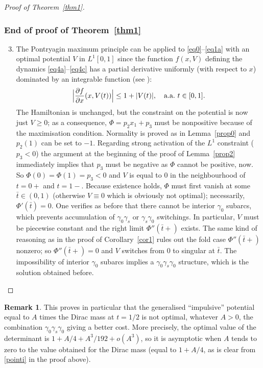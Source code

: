 \documentclass[10pt,a4paper]{amsart}
\providecommand{\Subsubsection}{\subsubsection}
\theoremstyle{plain}
\theoremstyle{definition}
\newtheorem{remark}[theorem]{Remark}
\renewcommand{\dot}[1]{#1'}
\renewcommand{\ddot}[1]{#1''}
\newcommand{\frp}[2]{\frac{\partial #1}{\partial #2}}
\begin{document}
\begin{proof}[Proof of Theorem~\ref{thm1}]
\Subsubsection*{End of proof of Theorem~\ref{thm1}}
\begin{enumerate}\setcounter{enumi}{2}
\item\label{pointiii}
The Pontryagin maximum principle can be applied to \eqref{eq0}--\eqref{eq1a}
with an optimal potential $V$ in $L^1[0,1]$ since the function $f(x,V)$
defining the dynamics
\eqref{eq4a}--\eqref{eq4c} has a partial derivative uniformly (with respect to $x$) dominated by
an integrable function (see \cite[\S 4.2.C, Rem.\,5]{cesari-1983a}):
\[
\Bigl|\frp{f}{x}(x,V(t))\Bigr| \leq 1+|V(t)|,\quad \text{a.a.\ }t \in [0,1].
\]
The Hamiltonian is unchanged, but the constraint on the potential is now just $V \geq 0$;
as a consequence, $\Phi=p_2x_1+p_3$ must be nonpositive because of the maximisation
condition. Normality is proved as in Lemma~\ref{prop0} and $p_2(1)$ can be set to $-1$.
Regarding strong activation of the $L^1$ constraint ($p_3<0$) the argument at the
beginning of the proof of Lemma~\ref{prop2} immediately implies that $p_3$ must be
negative as $\Phi$ cannot be positive, now. So $\Phi(0)=\Phi(1)=p_3<0$ and $V$ is
equal to $0$ in the neighbourhood of $t=0+$ and $t=1-$. Because existence holds,
$\Phi$ must first vanish at some $\bar{t} \in (0,1)$ (otherwise $V \equiv 0$ which is
obviously not optimal); necessarily, $\dot{\Phi}(\bar{t})=0$. One verifies as before
that there cannot be interior $\gamma_0$ subarcs, which prevents accumulation of
$\gamma_0\gamma_s$ or $\gamma_s\gamma_0$ switchings. In particular, $V$ must be piecewise
constant and the right limit $\ddot{\Phi}(\bar{t}+)$ exists. The same kind of reasoning
as in the proof of Corollary~\ref{cor1} rules out the fold case $\ddot{\Phi}(\bar{t}+)$
nonzero; so $\ddot{\Phi}(\bar{t}+)=0$ and $V$ switches from $0$ to singular at
$\bar{t}$. The impossibility of interior $\gamma_0$ subarcs implies a
$\gamma_0\gamma_s\gamma_0$ structure, which is the solution obtained before.\qedhere
\end{enumerate}
\end{proof}

\begin{remark}
This proves in particular that the generalised
``impulsive'' potential equal to $A$ times the
Dirac mass at $t=1/2$ is not optimal, whatever $A>0$,
the combination $\gamma_0\gamma_s\gamma_0$ giving a better cost.
More precisely, the optimal value of the determinant is $1+A/4+A^3/192+o(A^3)$,
so it is asymptotic when $A$ tends to zero to the value obtained for the Dirac mass
(equal to $1+A/4$, as is clear from \eqref{pointi} in the proof above).
\end{remark}
\end{document}
